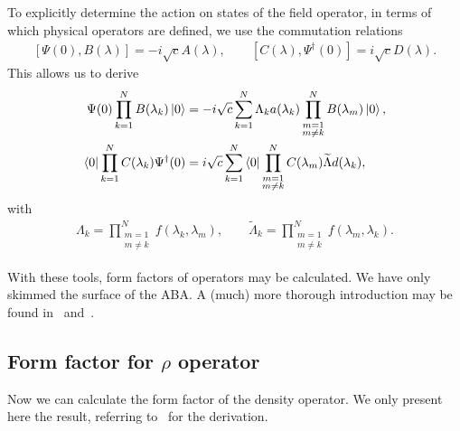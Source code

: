 \documentclass[11pt, a4paper]{report} %
\begin{document}
To explicitly determine the action on states of the field operator, in terms of which physical operators are defined, we use the commutation relations
\begin{align}
  \label{eq:47}
  [\Psi(0),B(\lambda)] = -i \sqrt{c} A(\lambda), \qquad [C(\lambda), \Psi^{\dag}(0)] = i \sqrt{c} D(\lambda).
\end{align}
This allows us to derive
\begin{align}
  \label{eq:48}
  \Psi(0) \prod_{k=1}^N B(\lambda_k) \ket{0} &= -i\sqrt{c} \sum_{k=1}^N\Lambda_k a(\lambda_k) \prod_{\substack{m=1\\m\neq k}}^N B(\lambda_m) \ket{0},\\
  \bra{0} \prod_{k=1}^N C(\lambda_k) \Psi^{\dag}(0) &= i \sqrt{c} \sum_{k=1}^N \bra{0} \prod_{\substack{m=1\\m\neq k}}^N C(\lambda_m) \widetilde{\Lambda} d(\lambda_k),
\end{align}
with~\cite{Piroli2015}
\begin{align}
  \label{eq:49}
  \Lambda_k = \prod_{\substack{m=1\\m\neq k}}^N f(\lambda_k,\lambda_m), \qquad \widetilde{\Lambda}_k = \prod_{\substack{m=1\\m\neq k}}^N f(\lambda_m,\lambda_k).
\end{align}

With these tools, form factors of operators may be calculated.
We have only skimmed the surface of the ABA.
A (much) more thorough introduction may be found in~\cite{Korepin1993} and~\cite{slavnov18_algeb_bethe_ansat}.


\subsection{Form factor for \(\rho\) operator}

Now we can calculate the form factor of the density operator.
We only present here the result, referring to~\cite{slavnov90_noneq_time_curren_correl_funct} for the derivation.
\end{document}
